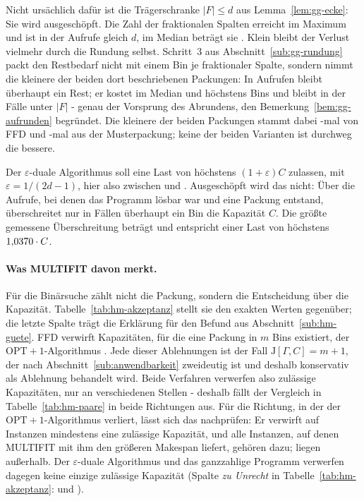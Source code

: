 Nicht ursächlich dafür ist die Trägerschranke $|F| \le d$ aus Lemma~\ref{lem:gg-ecke}: Sie wird
ausgeschöpft.
Die Zahl der fraktionalen Spalten erreicht im Maximum \HmFMax{} und ist in \HmFGleichD{} der
Aufrufe gleich $d$, im Median beträgt sie \HmFMedian.
Klein bleibt der Verlust vielmehr durch die Rundung selbst.
Schritt~3 aus Abschnitt~\ref{sub:gg-rundung} packt den Restbedarf nicht mit einem Bin je
fraktionaler Spalte, sondern nimmt die kleinere der beiden dort beschriebenen Packungen:
In \HmRestAufrufe{} Aufrufen bleibt überhaupt ein Rest; er kostet im Median
\HmRestBinsMedian{} und höchstens \HmRestBinsMax{} Bins und bleibt in \HmRestUnterFAnteil{} der
Fälle unter $|F|$ - genau der Vorsprung des Abrundens, den Bemerkung~\ref{bem:gg-aufrunden}
begründet.
Die kleinere der beiden Packungen stammt dabei \HmRestQuelleFfd-mal von FFD und
\HmRestQuelleMuster-mal aus der Musterpackung; keine der beiden Varianten ist durchweg die
bessere.

Der $\varepsilon$-duale Algorithmus soll eine Last von höchstens $(1+\varepsilon)C$ zulassen, mit
$\varepsilon = 1/(2d-1)$, hier also zwischen \HmEpsTheorieMin{} und \HmEpsTheorieMax.
Ausgeschöpft wird das nicht: Über die \HmEpsAufrufe{} Aufrufe, bei denen das Programm lösbar
war und eine Packung entstand, überschreitet nur in \HmEpsPositiv{} Fällen überhaupt ein Bin
die Kapazität $C$.
Die größte gemessene Überschreitung beträgt \HmEpsMax{} und entspricht einer Last von höchstens
$1{,}0370 \cdot C$.

\paragraph{Was MULTIFIT davon merkt.}
Für die Binärsuche zählt nicht die Packung, sondern die Entscheidung über die Kapazität.
Tabelle~\ref{tab:hm-akzeptanz} stellt sie den exakten Werten gegenüber; die letzte Spalte trägt
die Erklärung für den Befund aus Abschnitt~\ref{sub:hm-guete}.
FFD verwirft \HmZuUnrechtFfd{} Kapazitäten, für die eine Packung in $m$ Bins existiert, der
$\mathrm{OPT}+1$-Algorithmus \HmZuUnrechtJansen.
Jede dieser \HmZuUnrechtJansen{} Ablehnungen ist der Fall $\mathrm{J}[\Gamma,C] = m+1$, der nach
Abschnitt~\ref{sub:anwendbarkeit} zweideutig ist und deshalb konservativ als Ablehnung behandelt
wird.
Beide Verfahren verwerfen also zulässige Kapazitäten, nur an verschiedenen Stellen - deshalb
fällt der Vergleich in Tabelle~\ref{tab:hm-paare} in beide Richtungen aus.
Für die Richtung, in der der $\mathrm{OPT}+1$-Algorithmus verliert, lässt sich das nachprüfen:
Er verwirft auf \HmJansenFehlablehnungInstanzen{} Instanzen mindestens eine zulässige
Kapazität, und alle \HmJansenVerlusteMitFehlablehnung{} Instanzen, auf denen MULTIFIT mit ihm
den größeren Makespan liefert, gehören dazu; \HmJansenVerlusteOhne{} liegen außerhalb.
Der $\varepsilon$-duale Algorithmus und das ganzzahlige Programm verwerfen dagegen keine
einzige zulässige Kapazität (Spalte \emph{zu Unrecht} in Tabelle~\ref{tab:hm-akzeptanz}:
\HmZuUnrechtJansendual{} und \HmZuUnrechtGgip).

